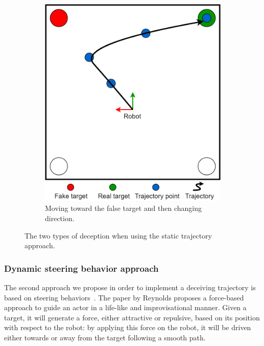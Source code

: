 \begin{figure}[H]
  \begin{subfigure}[t]{0.45\columnwidth}
  \centering
    \includegraphics[width=\linewidth]{images/06-deception/trajectoryLaura2}
    \caption{Moving toward the false target and then changing direction.}
    \label{fig:2}
  \end{subfigure}
  \caption{The two types of deception when using the static trajectory approach.}
  \label{fig::trajectoryStatic}
\end{figure}

\subsubsection{Dynamic steering behavior approach}
The second approach we propose in order to implement a deceiving trajectory is based on steering behaviors~\cite{reynolds_steering_1999}. The paper by Reynolds proposes a force-based approach to guide an actor in a life-like and improvisational manner. Given a target, it will generate a force, either attractive or repulsive, based on its position with respect to the robot: by applying this force on the robot, it will be driven either towards or away from the target following a smooth path.

